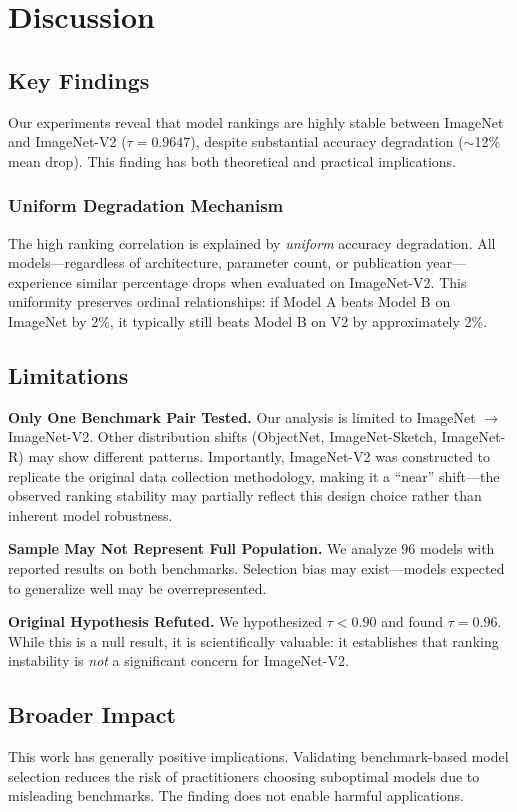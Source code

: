 \section{Discussion}
\label{sec:discussion}

\subsection{Key Findings}

Our experiments reveal that model rankings are highly stable between ImageNet and ImageNet-V2 ($\tau = 0.9647$), despite substantial accuracy degradation ($\sim$12\% mean drop). This finding has both theoretical and practical implications.

\subsubsection{Uniform Degradation Mechanism}

The high ranking correlation is explained by \emph{uniform} accuracy degradation. All models---regardless of architecture, parameter count, or publication year---experience similar percentage drops when evaluated on ImageNet-V2. This uniformity preserves ordinal relationships: if Model A beats Model B on ImageNet by 2\%, it typically still beats Model B on V2 by approximately 2\%.

\subsection{Limitations}

\textbf{Only One Benchmark Pair Tested.} Our analysis is limited to ImageNet $\rightarrow$ ImageNet-V2. Other distribution shifts (ObjectNet, ImageNet-Sketch, ImageNet-R) may show different patterns. Importantly, ImageNet-V2 was constructed to replicate the original data collection methodology, making it a ``near'' shift---the observed ranking stability may partially reflect this design choice rather than inherent model robustness.

\textbf{Sample May Not Represent Full Population.} We analyze 96 models with reported results on both benchmarks. Selection bias may exist---models expected to generalize well may be overrepresented.

\textbf{Original Hypothesis Refuted.} We hypothesized $\tau < 0.90$ and found $\tau = 0.96$. While this is a null result, it is scientifically valuable: it establishes that ranking instability is \emph{not} a significant concern for ImageNet-V2.

\subsection{Broader Impact}

This work has generally positive implications. Validating benchmark-based model selection reduces the risk of practitioners choosing suboptimal models due to misleading benchmarks. The finding does not enable harmful applications.
